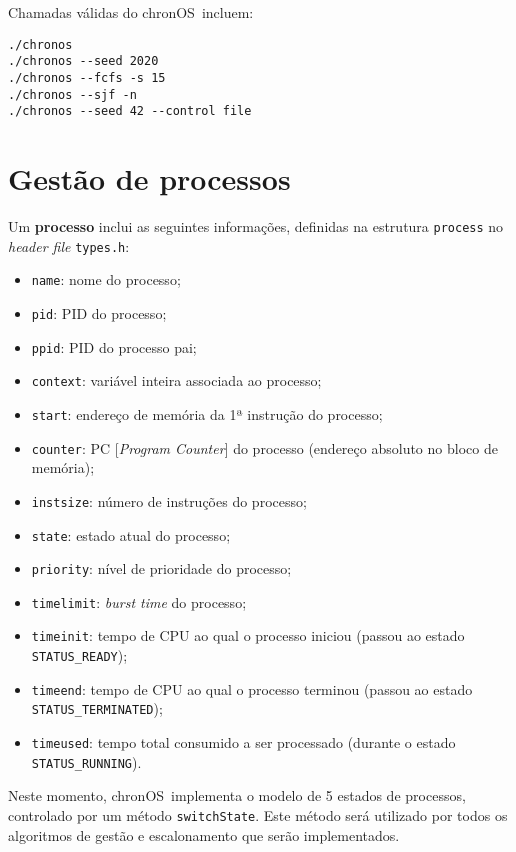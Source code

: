 \documentclass[10pt,oneside]{estiloUBI}
\newcommand{\chronOS}{\textsf{chronOS}}
\begin{document}
	Chamadas válidas do \chronOS~incluem:
	
	\begin{verbatim}
./chronos
./chronos --seed 2020
./chronos --fcfs -s 15
./chronos --sjf -n
./chronos --seed 42 --control file
	\end{verbatim}
	
	
	
	\chapter{Gestão de processos}
	\label{sec:process}
	
	Um \textbf{processo} inclui as seguintes informações, definidas na estrutura \verb|process| no \textit{header file} \texttt{types.h}:
	
	\begin{itemize}
		\item \verb|name|: nome do processo;
		\item \verb|pid|: \ac{PID} do processo;
		\item \verb|ppid|: \ac{PID} do processo pai;
		\item \verb|context|: variável inteira associada ao processo;
		\item \verb|start|: endereço de memória da 1ª instrução do processo;
		\item \verb|counter|: PC [\textit{Program Counter}] do processo (endereço absoluto no bloco de memória);
		\item \verb|instsize|: número de instruções do processo;
		\item \verb|state|: estado atual do processo;
		\item \verb|priority|: nível de prioridade do processo;
		\item \verb|timelimit|: \textit{burst time} do processo;
		\item \verb|timeinit|: tempo de \ac{CPU} ao qual o processo iniciou (passou ao estado \texttt{STATUS\_READY});
		\item \verb|timeend|: tempo de \ac{CPU} ao qual o processo terminou (passou ao estado \texttt{STATUS\_TERMINATED});
		\item \verb|timeused|: tempo total consumido a ser processado (durante o estado \texttt{STATUS\_RUNNING}).
	\end{itemize}
	
	Neste momento, \chronOS~implementa o modelo de 5 estados de processos, controlado por um método \verb|switchState|. Este método será utilizado por todos os algoritmos de gestão e escalonamento que serão implementados.
	
\end{document}
